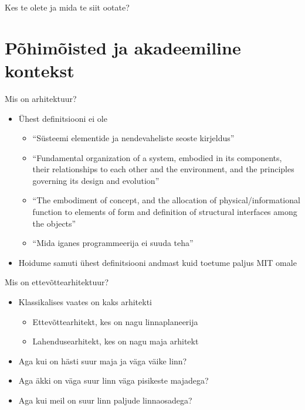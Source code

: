 \documentclass{beamer}
\begin{document}
\begin{frame}[standout]
Kes te olete ja mida te siit ootate?
\end{frame}

\section{Põhimõisted ja akadeemiline kontekst}
\begin{frame}{Mis on arhitektuur?}
	\begin{itemize}
		\item Ühest definitsiooni ei ole
		\begin{itemize}
			\item \enquote{Süsteemi elementide ja nendevaheliste seoste kirjeldus}
			\item \enquote{Fundamental organization of a system, embodied in its components, their relationships to each other and the environment, and the principles governing its design and evolution}
			\item \enquote{The embodiment of concept, and the allocation of physical/informational function to elements of form and definition of structural interfaces among the objects}
			\item \enquote{Mida iganes programmeerija ei suuda teha}
		\end{itemize}
		\item Hoidume samuti ühest definitsiooni andmast kuid toetume paljus MIT omale
	\end{itemize}

\end{frame}

\begin{frame}{Mis on ettevõttearhitektuur?}
	\begin{itemize}
		\item Klassikalises vaates on kaks arhitekti
		\begin{itemize}	
			\item Ettevõttearhitekt, kes on nagu linnaplaneerija
			\item Lahendusearhitekt, kes on nagu maja arhitekt
		\end{itemize}
		\item Aga kui on hästi suur maja ja väga väike linn?
		\item Aga äkki on väga suur linn väga pisikeste majadega?
		\item Aga kui meil on suur linn paljude linnaosadega?
	\end{itemize}
\end{frame}
\end{document}
